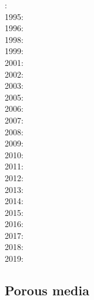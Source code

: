 {\scriptsize
{}: \cite{rich94}\cite{fari94}\\
1995: \cite{whmc95}\\
1996: \cite{zhgm96}\\
1998: \cite{bisp98}\cite{most98}\\
1999: \cite{most99}\cite{shet99}\\
2001: \cite{vapy01}\\
2002: \cite{foul02}\\
2003: \cite{vazh03}\\
2005: \cite{bugu05}\cite{fasa05}\\
2006: \cite{dabu06}\\
2007: \cite{stco07}\\
2008: \cite{uegs08}\cite{slee08}\\
2009: \cite{bucl09}\cite{zhgy09}\cite{baiv10}\cite{tabs09}\cite{maml09}\\
2010: \cite{fabl10}\\
2011: \cite{sosk11}\cite{vasd11}\\
2012: \cite{huco12}\cite{gubc12}\cite{egim17}\\
2013: \cite{bemm12}\cite{brps13}\\
2014: \cite{buge14}\cite{gery14b}\cite{buto14}\cite{buit14}\cite{leli14}\\
2015: \cite{bemm15}\cite{gesb15}\cite{kocb15}\cite{meds15}\cite{lile15}\cite{medd15}\cite{frro15}\\
2016: \cite{fige16}\cite{gadb16}\cite{kobc16}\\
2017: \cite{bahf17}\cite{brsg17}\cite{bahf17}\cite{bekb17}\cite{kocb17}\\
2018: \cite{daga18}\cite{frkc18}\cite{frbr18}\\
2019: \cite{kobg19}\cite{stbl19}\cite{botb19}
}

\subsection{Porous media} 

{\scriptsize
\noindent
\cite{scst86}
\cite{scot88}
\cite{spie93}
\cite{scth00b}
\cite{dyge13}
\cite{eitp19}
\cite{eitf20}
}


